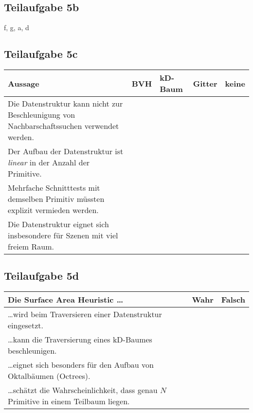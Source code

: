\documentclass[a4paper]{scrartcl}
\begin{document}
\subsection*{Teilaufgabe 5b}
f, g, a, d

\subsection*{Teilaufgabe 5c}
\begin{tabular}{p{7cm}p{1.5cm}p{1.5cm}p{1.5cm}p{1.5cm}}\toprule
	\textbf{Aussage}                                                                           & \textbf{BVH} & \textbf{kD-Baum} & \textbf{Gitter} & \textbf{keine} \\\midrule
	Die Datenstruktur kann nicht zur Beschleunigung von Nachbarschaftssuchen verwendet werden. & \CheckedBox  & \CheckedBox      & \Square         & \Square        \\
	Der Aufbau der Datenstruktur ist \textit{linear} in der Anzahl der Primitive.              & \Square      & \Square          & \CheckedBox     & \Square        \\
	Mehrfache Schnitttests mit demselben Primitiv müssten explizit vermieden werden.           & \CheckedBox  & \CheckedBox      & \CheckedBox     & \Square        \\
	Die Datenstruktur eignet sich insbesondere für Szenen mit viel freiem Raum.                & \CheckedBox  & \CheckedBox      & \Square         & \Square        \\\bottomrule
\end{tabular}

\subsection*{Teilaufgabe 5d}
\begin{tabular}{p{12cm}ll}\toprule
	\textbf{Die Surface Area Heuristic \dots}                                                & \textbf{Wahr} & \textbf{Falsch} \\\midrule
	\dots wird beim Traversieren einer Datenstruktur eingesetzt.                             & \Square       & \CheckedBox \\
	\dots kann die Traversierung eines kD-Baumes beschleunigen.                              & \CheckedBox   & \Square     \\
	\dots eignet sich besonders für den Aufbau von Oktalbäumen (Octrees).                    & \Square       & \CheckedBox \\
	\dots schätzt die Wahrscheinlichkeit, dass genau $N$ Primitive in einem Teilbaum liegen. & \Square       & \CheckedBox \\\bottomrule
\end{tabular}
\end{document}
